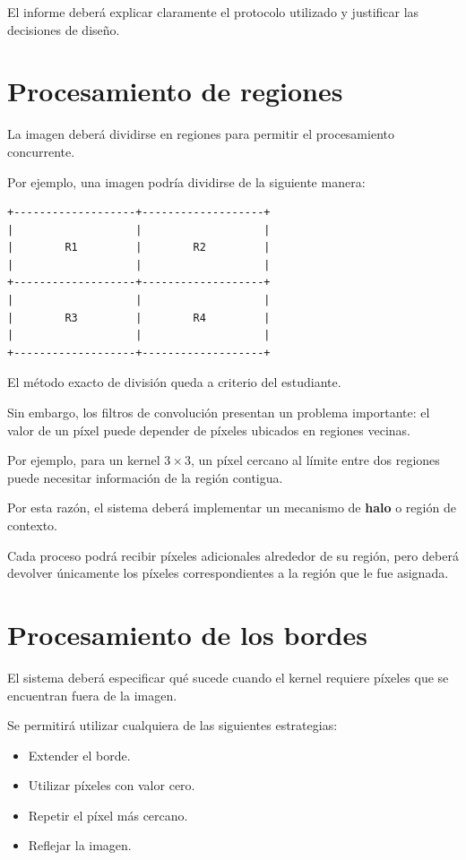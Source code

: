 \documentclass[11pt,a4paper]{article}
\begin{document}
El informe deberá explicar claramente el protocolo utilizado y
justificar las decisiones de diseño.

\section{Procesamiento de regiones}

La imagen deberá dividirse en regiones para permitir el procesamiento
concurrente.

Por ejemplo, una imagen podría dividirse de la siguiente manera:

\begin{center}
\begin{verbatim}
+-------------------+-------------------+
|                   |                   |
|        R1         |        R2         |
|                   |                   |
+-------------------+-------------------+
|                   |                   |
|        R3         |        R4         |
|                   |                   |
+-------------------+-------------------+
\end{verbatim}
\end{center}

El método exacto de división queda a criterio del estudiante.

Sin embargo, los filtros de convolución presentan un problema
importante: el valor de un píxel puede depender de píxeles ubicados en
regiones vecinas.

Por ejemplo, para un kernel $3\times3$, un píxel cercano al límite entre
dos regiones puede necesitar información de la región contigua.

Por esta razón, el sistema deberá implementar un mecanismo de
\textbf{halo} o región de contexto.

Cada proceso podrá recibir píxeles adicionales alrededor de su región,
pero deberá devolver únicamente los píxeles correspondientes a la
región que le fue asignada.

\section{Procesamiento de los bordes}

El sistema deberá especificar qué sucede cuando el kernel requiere
píxeles que se encuentran fuera de la imagen.

Se permitirá utilizar cualquiera de las siguientes estrategias:

\begin{itemize}
\item Extender el borde.
\item Utilizar píxeles con valor cero.
\item Repetir el píxel más cercano.
\item Reflejar la imagen.
\end{itemize}
\end{document}

